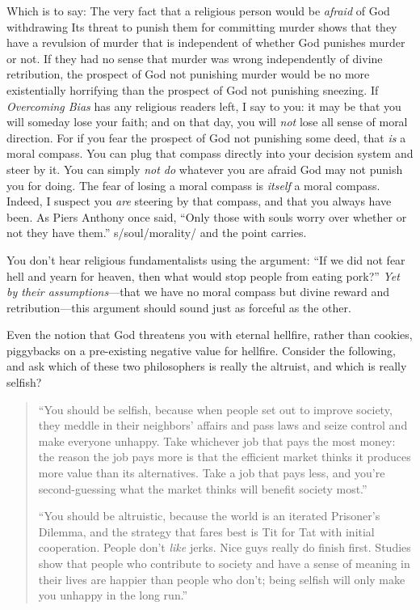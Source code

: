 {
 Which is to say: The very fact that a religious person would be
\textit{afraid} of God withdrawing Its threat to punish them for
committing murder shows that they have a revulsion of murder that is
independent of whether God punishes murder or not. If they had no sense
that murder was wrong independently of divine retribution, the prospect
of God not punishing murder would be no more existentially horrifying
than the prospect of God not punishing sneezing. If \textit{Overcoming
Bias} has any religious readers left, I say to you: it may be that you
will someday lose your faith; and on that day, you will \textit{not}
lose all sense of moral direction. For if you fear the prospect of God
not punishing some deed, that \textit{is} a moral compass. You can plug
that compass directly into your decision system and steer by it. You
can simply \textit{not do} whatever you are afraid God may not punish
you for doing. The fear of losing a moral compass is \textit{itself} a
moral compass. Indeed, I suspect you \textit{are} steering by that
compass, and that you always have been. As Piers Anthony once said,
``Only those with souls worry over whether or not they
have them.'' s/soul/morality/ and the point carries.}

{
 You don't hear religious fundamentalists using the
argument: ``If we did not fear hell and yearn for
heaven, then what would stop people from eating
pork?'' \textit{Yet by their assumptions}{}---that we
have no moral compass but divine reward and retribution---this argument
should sound just as forceful as the other.}

{
 Even the notion that God threatens you with eternal hellfire,
rather than cookies, piggybacks on a pre-existing negative value for
hellfire. Consider the following, and ask which of these two
philosophers is really the altruist, and which is really selfish?}

\begin{quotation}
{
 ``You should be selfish, because when people set
out to improve society, they meddle in their neighbors'
affairs and pass laws and seize control and make everyone unhappy. Take
whichever job that pays the most money: the reason the job pays more is
that the efficient market thinks it produces more value than its
alternatives. Take a job that pays less, and you're
second-guessing what the market thinks will benefit society
most.''}

{
 ``You should be altruistic, because the world is
an iterated Prisoner's Dilemma, and the strategy that
fares best is Tit for Tat with initial cooperation. People
don't \textit{like} jerks. Nice guys really do finish
first. Studies show that people who contribute to society and have a
sense of meaning in their lives are happier than people who
don't; being selfish will only make you unhappy in the
long run.''}
\end{quotation}

